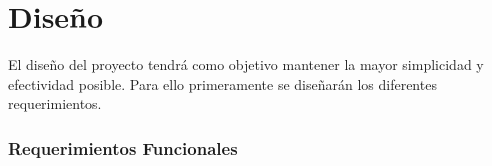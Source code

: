 
\chapter{Diseño}


El diseño del proyecto tendrá como objetivo mantener la mayor simplicidad y efectividad posible. Para ello primeramente se diseñarán los diferentes requerimientos. 

\subsection{Requerimientos Funcionales}

